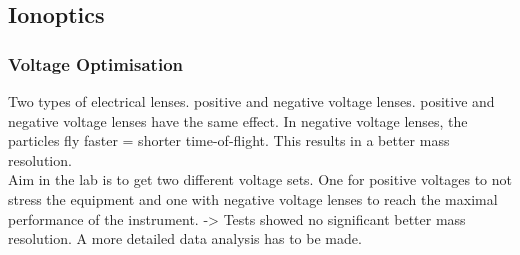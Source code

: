 	
	\subsection{Ionoptics}
	\subsubsection{Voltage Optimisation}
	Two types of electrical lenses. positive and negative voltage lenses. positive and negative voltage lenses have the same effect. In negative voltage lenses, the particles fly faster = shorter time-of-flight. This results in a better mass resolution.\\
	Aim in the lab is to get two different voltage sets. One for positive voltages to not stress the equipment and one with negative voltage lenses to reach the maximal performance of the instrument. -> Tests showed no significant better mass resolution. A more detailed data analysis has to be made. %
	
	
	
	
	
	